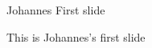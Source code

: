 \begin{frame}{Johannes First slide}
\begin{block}{}
  This is Johannes's first slide
\end{block}
\end{frame}